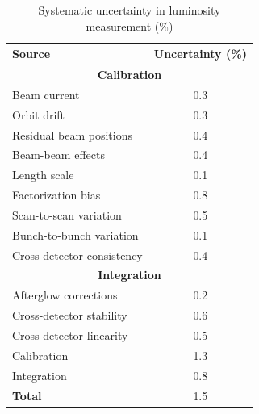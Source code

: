 \begin{table}[H]
  \centering
  \caption{Systematic uncertainty in luminosity measurement (\%) \cite{pas_22}}
    \begin{tabular}{l|c}
        \textbf{Source} & \textbf{Uncertainty (\%)} \\
        \hline
        \multicolumn{2}{c}{\textbf{Calibration}} \\
        \hline
        Beam current & 0.3 \\
        Orbit drift & 0.3 \\
        Residual beam positions & 0.4 \\
        Beam-beam effects & 0.4 \\
        Length scale & 0.1 \\
        Factorization bias & 0.8 \\
        Scan-to-scan variation & 0.5 \\
        Bunch-to-bunch variation & 0.1 \\
        Cross-detector consistency & 0.4 \\
        \hline
        \multicolumn{2}{c}{\textbf{Integration}} \\
        \hline
        Afterglow corrections & 0.2 \\
        Cross-detector stability & 0.6 \\
        Cross-detector linearity & 0.5 \\
        \hline
        Calibration & 1.3 \\
        Integration & 0.8 \\
        \hline
        \textbf{Total} & 1.5 \\
    \end{tabular}
    \label{table:correction_uncertainties}
\end{table}


